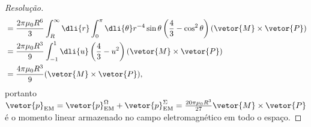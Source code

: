 \begin{proof}[Resolução]
\begin{align*}
                                       &= \frac{2\pi \mu_0 R^6}{3}\int_R^\infty\dli{r} \int_0^\pi \dli{\theta}r^{-4} \sin\theta\left(\frac{4}{3} - \cos^2\theta\right)(\vetor{M}\times \vetor{P})\\
                                       &= \frac{2\pi \mu_0 R^3}{9} \int_{-1}^1\dli{u} \left(\frac{4}{3} - u^2\right)(\vetor{M}\times \vetor{P})\\
                                       &= \frac{4\pi\mu_0 R^3}{9}(\vetor{M} \times \vetor{P}),
    \end{align*}
    portanto \(\vetor{p}_\mathrm{EM} = \vetor{p}_\mathrm{EM}^\Omega + \vetor{p}_\mathrm{EM}^\Sigma = \frac{20\pi \mu_0 R^3}{27}\vetor{M}\times\vetor{P}\) é o momento linear armazenado no campo eletromagnético em todo o espaço.
\end{proof}
